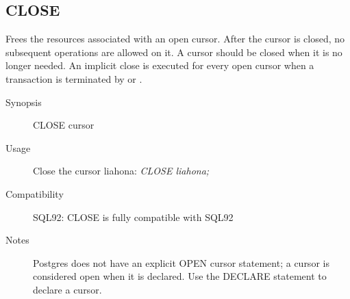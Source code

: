 \subsection{CLOSE}
Frees the resources associated with an open cursor.
After the cursor is closed, no subsequent operations are allowed on it.
A cursor should be closed when it is no longer needed.
An implicit close is executed for every open cursor when a transaction is terminated by
or
.

\begin{description}

\item[Synopsis]
CLOSE cursor

\item[Usage]
Close the cursor liahona:
\textit{CLOSE liahona;}

\item[Compatibility]
SQL92: CLOSE is fully compatible with SQL92

\item[Notes]
Postgres does not have an explicit OPEN cursor statement; a cursor is considered open when it is declared. Use the DECLARE statement to declare a cursor.

\end{description}